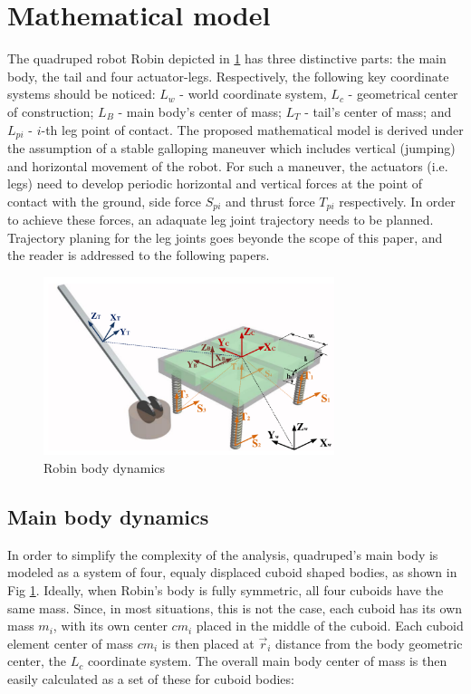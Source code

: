 \section{Mathematical model}
The quadruped robot Robin depicted in \ref{fig:rmoment} has three distinctive parts: the main body, the tail and four actuator-legs. Respectively, the following key coordinate systems should be noticed: $L_w$ - world coordinate system, $L_c$ - geometrical center of construction; $L_B$ - main body's center of mass; $L_T$ - tail's center of mass; and $L_{pi}$ - $i$-th leg point of contact. The proposed mathematical model is derived under the assumption of a stable galloping maneuver which includes vertical (jumping) and horizontal movement of the robot. For such a maneuver, the actuators (i.e. legs) need to develop periodic horizontal and vertical forces at the point of contact with the ground, side force $S_{pi}$ and thrust force $T_{pi}$ respectively. In order to achieve these forces, an adaquate leg joint trajectory needs to be planned. Trajectory planing for the leg joints goes beyonde the scope of this paper, and the reader is addressed to the following papers. 

\begin{figure}
	\centering
	\includegraphics[width=85mm]{./pictures/RobinMoment.pdf}
	\caption{Robin body dynamics}
	\label{fig:rmoment}
\end{figure}

\subsection{Main body dynamics}
In order to simplify the complexity of the analysis, quadruped's main body is modeled as a system of four, equaly displaced cuboid shaped bodies, as shown in Fig \ref{fig:rmoment}. Ideally, when Robin's body is fully symmetric, all four cuboids have the same mass. Since, in most situations, this is not the case, each cuboid has its own mass $m_i$, with its own center $cm_i$ placed in the middle of the cuboid. Each cuboid element center of mass $cm_i$ is then placed at $\vec{r}_i$ distance from the body geometric center, the $L_c$ coordinate system. The overall main body center of mass is then easily calculated as a set of these for cuboid bodies:
 
